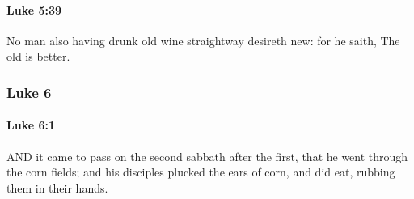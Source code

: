 		\paragraph{Luke 5:39} %
			\label{LUKE-5-39}

			No man also having drunk old wine straightway desireth new: for he saith, The old is better.

			\begin{framed}
			\scriptsize
				\begin{compactdesc}
					\item[SBLG] 
				\end{compactdesc}
			\end{framed}

	\subsubsection{Luke 6} %
		\label{LUKE-6}
		
		\paragraph{Luke 6:1} %
			\label{LUKE-6-1}

			AND it came to pass on the second sabbath after the first, that he went through the corn fields; and his disciples plucked the ears of corn, and did eat, rubbing them in their hands.

